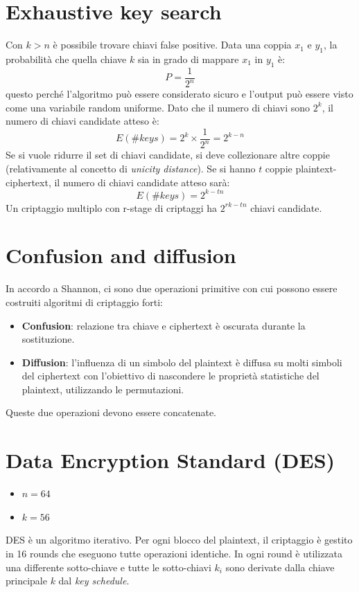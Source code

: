 \documentclass[a4paper,12pt]{article}
\begin{document}
\section{Exhaustive key search}
Con $k > n$ è possibile trovare chiavi false positive. Data una coppia $x_1$ e $y_1$, la probabilità che quella chiave $k$ sia in grado di mappare $x_1$ in $y_1$ è:
$$ P = \frac{1}{2^n} $$
questo perché l'algoritmo può essere considerato sicuro e l'output può essere visto come una variabile random uniforme.
Dato che il numero di chiavi sono $2^k$, il numero di chiavi candidate atteso è: 
$$ E(\#keys) = 2^k \times \frac{1}{2^n} = 2^{k-n}$$
Se si vuole ridurre il set di chiavi candidate, si deve collezionare altre coppie (relativamente al concetto di \textit{unicity distance}). Se si hanno $t$ coppie plaintext-ciphertext, il numero di chiavi candidate atteso sarà:
$$ E(\#keys) = 2^{k-tn} $$
Un criptaggio multiplo con r-stage di criptaggi ha $2^{rk-tn}$ chiavi candidate.

\section{Confusion and diffusion}
In accordo a Shannon, ci sono due operazioni primitive con cui possono essere costruiti algoritmi di criptaggio forti:
\begin{itemize}							
	\item \textbf{Confusion}: relazione tra chiave e ciphertext è oscurata durante la sostituzione.
	\item \textbf{Diffusion}: l'influenza di un simbolo del plaintext è diffusa su molti simboli del ciphertext con l'obiettivo di nascondere le proprietà statistiche del plaintext, utilizzando le permutazioni.
\end{itemize}
Queste due operazioni devono essere concatenate.

\section{Data Encryption Standard (DES)}
\begin{itemize}
	\item $n = 64$
	\item $k = 56$
\end{itemize}
DES è un algoritmo iterativo. Per ogni blocco del plaintext, il criptaggio è gestito in 16 rounds che eseguono tutte operazioni identiche. 
In ogni round è utilizzata una differente sotto-chiave e tutte le sotto-chiavi $k_i$ sono derivate dalla chiave principale $k$ dal \textit{key schedule}.
\end{document}
